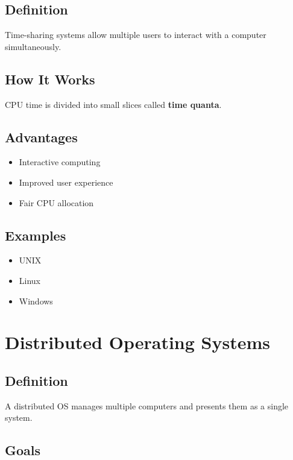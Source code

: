 \subsection{Definition}

Time-sharing systems allow multiple users to interact with a computer simultaneously.

\subsection{How It Works}

CPU time is divided into small slices called \textbf{time quanta}.

\subsection{Advantages}

\begin{itemize}
\item Interactive computing
\item Improved user experience
\item Fair CPU allocation
\end{itemize}

\subsection{Examples}

\begin{itemize}
\item UNIX
\item Linux
\item Windows
\end{itemize}

\section{Distributed Operating Systems}

\subsection{Definition}

A distributed OS manages multiple computers and presents them as a single system.

\subsection{Goals}

